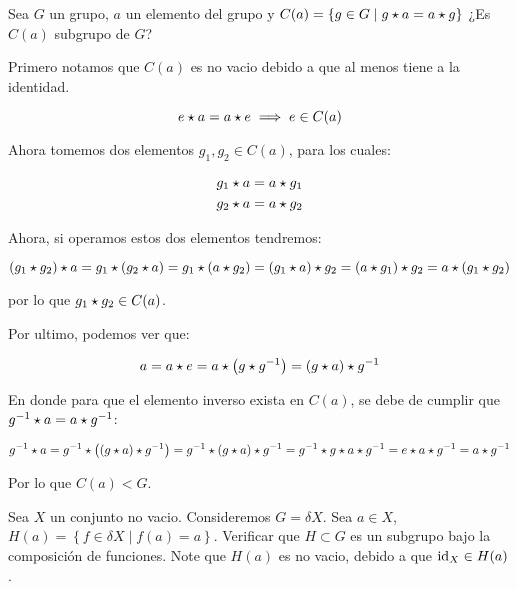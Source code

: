         \begin{ejemplo}
            Sea $G$ un grupo, $a$ un elemento del grupo y $C(a) = \left\{ g \in G \mid g \star a = a \star g \right\}$ ¿Es $C(a)$ subgrupo de $G$?

            Primero notamos que $C(a)$ es no vacio debido a que al menos tiene a la identidad.

            \begin{equation*}
                e \star a = a \star e \implies e \in C(a)
            \end{equation*}

            Ahora tomemos dos elementos $g_1, g_2 \in C(a)$, para los cuales:

            \begin{align*}
                g_1 \star a &= a \star g_1 \\
                g_2 \star a &= a \star g_2
            \end{align*}

            Ahora, si operamos estos dos elementos tendremos:

            \begin{equation*}
                (g_1 \star g_2) \star a = g_1 \star (g_2 \star a) = g_1 \star (a \star g_2) = (g_1 \star a) \star g_2 = (a \star g_1) \star g_2 = a \star (g_1 \star g_2)
            \end{equation*}

            por lo que $g_1 \star g_2 \in C(a)$.

            Por ultimo, podemos ver que:

            \begin{equation*}
                a = a \star e = a \star \left( g \star g^{-1} \right) = (g \star a) \star g^{-1}
            \end{equation*}

            En donde para que el elemento inverso exista en $C(a)$, se debe de cumplir que $g^{-1} \star a = a \star g^{-1}$:

            \begin{equation*}
                g^{-1} \star a = g^{-1} \star \left( (g \star a) \star g^{-1} \right) = g^{-1} \star (g \star a) \star g^{-1} = g^{-1} \star g \star a \star g^{-1} = e \star a \star g^{-1} = a \star g^{-1}
            \end{equation*}

            Por lo que $C(a) < G$.
        \end{ejemplo}

        \begin{ejercicio}
            Sea $X$ un conjunto no vacio. Consideremos $G = \delta X$. Sea $a \in X$, $H(a) = \left\{ f \in \delta X \mid f(a) = a \right\}$. Verificar que $H \subset G$ es un subgrupo bajo la composición de funciones. Note que $H(a)$ es no vacio, debido a que $\operatorname{id}_X \in H(a)$.
        \end{ejercicio}

